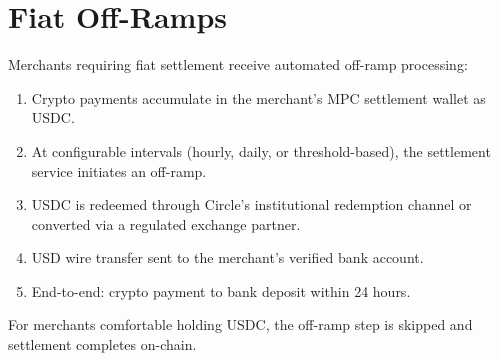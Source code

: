 \section{Fiat Off-Ramps}

\label{sec:offramp}

Merchants requiring fiat settlement receive automated off-ramp
processing:

\begin{enumerate}[leftmargin=1.4em]
    \item Crypto payments accumulate in the merchant's MPC settlement
    wallet as USDC.
    \item At configurable intervals (hourly, daily, or threshold-based),
    the settlement service initiates an off-ramp.
    \item USDC is redeemed through Circle's institutional redemption
    channel or converted via a regulated exchange partner.
    \item USD wire transfer sent to the merchant's verified bank account.
    \item End-to-end: crypto payment to bank deposit within 24 hours.
\end{enumerate}

For merchants comfortable holding USDC, the off-ramp step is skipped
and settlement completes on-chain.

